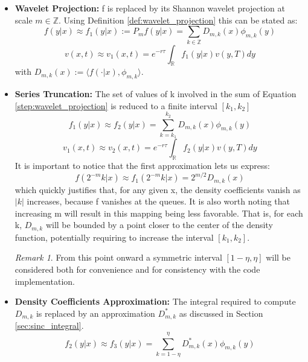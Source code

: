 \documentclass[12,twoside]{mammeTFM}
\theoremstyle{definition}
\theoremstyle{remark}
\newtheorem{remark}[thm]{Remark}
\newcommand{\Z}{\ensuremath{\mathbb{Z}}}
\newcommand{\R}{\ensuremath{\mathbb{R}}}
\begin{document}
\begin{itemize} \label{swift_steps}

\item \textbf{Wavelet Projection:} f is replaced by its Shannon wavelet projection at scale $m \in \Z$. Using Definition \ref{def:wavelet_projection} this can be stated as:
\begin{equation} \label{step:wavelet_projection}
f(y|x) \approx f_1(y|x) := P_mf(y|x) = \sum_{k \in \Z} D_{m,k}(x) \phi_{m,k}(y)
\end{equation}
\begin{equation}
v(x,t) \approx v_1(x,t) = e^{-r \tau} \int_{\R} f_1(y|x)v(y, T)dy
\end{equation}
with $D_{m,k}(x):=\langle f(\cdot | x), \phi_{m,k} \rangle$.
\item \textbf{Series Truncation: } The set of values of k involved in the sum of Equation \ref{step:wavelet_projection} is reduced to a finite interval $[k_1, k_2]$
\begin{equation}
f_1(y|x) \approx f_2(y|x) = \sum_{k = k_1}^{k_2} D_{m,k}(x)\phi_{m,k}(y)
\end{equation}
\begin{equation} \label{step:series_truncation}
v_1(x,t) \approx v_2(x,t) = e^{-r \tau} \int_{\R} f_2(y|x)v(y, T)dy
\end{equation}
It is important to notice that the first approximation lets us express: 
\begin{equation}
f(2^{-m}k|x) \approx f_1(2^{-m}k|x) = 2^{m/2} D_{m,k}(x)
\end{equation}
which quickly justifies that, for any given x, the density coefficients vanish as $|k|$ increases, because f vanishes at the queues. It is also worth noting that increasing m will result in this mapping being less favorable. That is, for each k, $D_{m,k}$ will be bounded by a point closer to the center of the density function, potentially requiring to increase the interval $[k_1, k_2]$.
\begin{remark}
From this point onward a symmetric interval $[1 - \eta, \eta]$ will be considered both for convenience and for consistency with the code implementation.
\end{remark}
\item \textbf{Density Coefficients Approximation: }
The integral required to compute $D_{m,k}$ is replaced by an approximation $D_{m,k}^{*}$ as discussed in Section \ref{sec:sinc_integral}.
\begin{equation}
f_2 (y|x) \approx f_3(y | x) = \sum_{k = 1 - \eta}^{\eta} D_{m,k}^{*}(x)\phi_{m,k}(y)

\end{equation}
\end{itemize}
\end{document}
